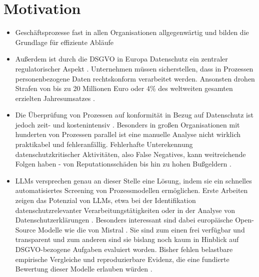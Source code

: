 \section{Motivation}\label{sec:motivation}

\begin{itemize}
    \item Geschäftsprozesse fast in allen Organisationen allgegenwärtig und bilden die Grundlage für effiziente Abläufe
    \item Außerdem ist durch die \ac{DSGVO} in Europa Datenschutz ein zentraler regulatorischer Aspekt \cite{GDPR2016, Capodieci2023BPMNEnabledDP}. Unternehmen müssen sicherstellen, dass in Prozessen personenbezogene Daten rechtskonform verarbeitet werden. Ansonsten drohen Strafen von bis zu 20 Millionen Euro oder 4\% des weltweiten gesamten erzielten Jahresumsatzes \cite{GDPR2016}.
    \item Die Überprüfung von Prozessen auf konformität in Bezug auf Datenschutz ist jedoch zeit- und kostenintensiv \cite{nake2023towards, varela2025business}. Besonders in großen Organisationen mit hunderten von Prozessen parallel ist eine manuelle Analyse nicht wirklich praktikabel und fehleranfällig. Fehlerhafte Unterekennung datenschutzkritischer Aktivitäten, also False Negatives, kann weitreichende Folgen haben - von Reputationsschäden bis hin zu hohen Bußgeldern \cite{nake2023towards}.
    \item \acp{LLM} versprechen genau an dieser Stelle eine Lösung, indem sie ein schnelles automatisiertes Screening von Prozessmodellen ermöglichen. Erste Arbeiten zeigen das Potenzial von \acp{LLM}, etwa bei der Identifikation datenschutzrelevanter Verarbeitungstätigkeiten oder in der Analyse von Datenschutzerklärungen \cite{ciaramella2022leveraging, pragyan2024toward}. Besonders interessant sind dabei europäische Open-Source Modelle wie die von Mistral \cite{mistralai}. Sie sind zum einen frei verfügbar und transparent und zum anderen sind sie bislang noch kaum in Hinblick auf \ac{DSGVO}-bezogene Aufgaben evaluiert worden. Bisher fehlen belastbare empirische Vergleiche und reproduzierbare Evidenz, die eine fundierte Bewertung dieser Modelle erlauben würden \cite{schwerin2024systematic}.
\end{itemize}